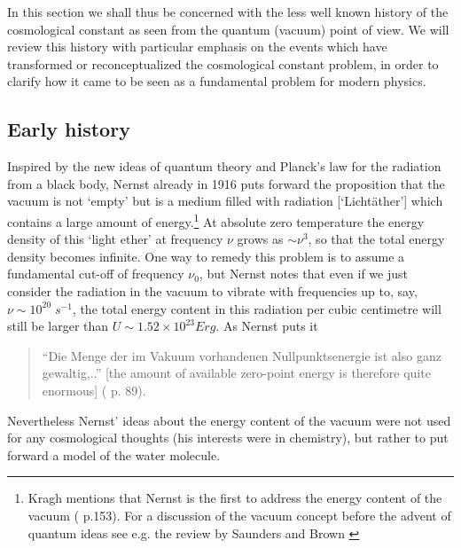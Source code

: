 \documentclass[12pt]{article}
\def\ss{\subsection}
\begin{document}
In this section we shall thus be concerned with the less well known
history of the cosmological constant as seen from the quantum (vacuum)
point of view.  We will review this history with particular emphasis
on the events which have transformed or reconceptualized the
cosmological constant problem, in order to clarify how it came 
to be seen as a fundamental problem for modern physics. \\


\ss{Early history}

Inspired by the new ideas of quantum theory and Planck's law for
the radiation from a black body, Nernst already in 1916
\cite{nernst16} puts forward the proposition that the vacuum is
not `empty' but is a medium filled with radiation
[`Licht\"{a}ther'] which contains a large amount of
energy.\footnote{Kragh mentions that Nernst is the first to
address the energy content of the vacuum (\cite{kragh96} p.153).
For a discussion of the vacuum concept before the advent of
quantum ideas see e.g. the review by Saunders and Brown
\cite{saunders91}} At absolute zero temperature the energy density
of this `light ether' at frequency $\nu$ grows as $\sim \nu^3$, so
that the total energy density becomes infinite. One way to remedy
this problem is to assume a fundamental cut-off of frequency
$\nu_0$, but Nernst notes that even if we just consider the
radiation in the vacuum to vibrate with frequencies up to, say,
$\nu \sim 10^{20} \; s^{-1}$, the total energy content in this
radiation per cubic centimetre will still be larger than $ U \sim
1.52 \times 10^{23} Erg $. As Nernst puts it 
\begin{quote}
``Die Menge der im Vakuum vorhandenen Nullpunktsenergie ist
also ganz gewaltig,..'' [the amount of available zero-point energy is
therefore quite enormous] (\cite{nernst16} p. 89).  
\end{quote}
Nevertheless
Nernst' ideas about the energy content of the vacuum were not
used for any cosmological thoughts (his interests were in chemistry),
but rather to put forward a model of the water molecule.
\end{document}
